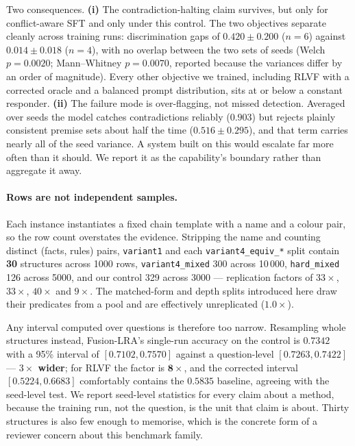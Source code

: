 \documentclass{article}
\begin{document}
Two consequences. \textbf{(i)} The contradiction-halting claim survives, but
only for conflict-aware SFT and only under this control. The two objectives
separate cleanly across training runs: discrimination gaps of
$0.420 \pm 0.200$ ($n{=}6$) against $0.014 \pm 0.018$ ($n{=}4$), with no overlap
between the two sets of seeds (Welch $p{=}0.0020$; Mann--Whitney $p{=}0.0070$,
reported because the variances differ by an order of magnitude). Every other
objective we trained, including \textsc{RLVF} with a corrected oracle and a
balanced prompt distribution, sits at or below a constant responder. \textbf{(ii)}
The failure mode is over-flagging, not missed detection. Averaged over seeds the
model catches contradictions reliably ($0.903$) but rejects plainly consistent
premise sets about half the time ($0.516 \pm 0.295$), and that term carries
nearly all of the seed variance. A system built on this would escalate far more
often than it should. We report it as the capability's boundary rather than
aggregate it away.

\paragraph{Rows are not independent samples.} Each instance instantiates a fixed
chain template with a name and a colour pair, so the row count overstates the
evidence. Stripping the name and counting distinct (facts, rules) pairs,
\texttt{variant1} and each \texttt{variant4\_equiv\_*} split contain
\textbf{30} structures across 1000 rows, \texttt{variant4\_mixed} 300 across
10\,000, \texttt{hard\_mixed} 126 across 5000, and our control 329 across 3000
--- replication factors of $33\times$, $33\times$, $40\times$ and $9\times$. The
matched-form and depth splits introduced here draw their predicates from a pool
and are effectively unreplicated ($1.0\times$).

Any interval computed over questions is therefore too narrow. Resampling whole
structures instead, Fusion-LRA's single-run accuracy on the control is
$0.7342$ with a 95\% interval of $[0.7102, 0.7570]$ against a question-level
$[0.7263, 0.7422]$ --- \textbf{$3\times$ wider}; for \textsc{RLVF} the factor is
$\mathbf{8\times}$, and the corrected interval $[0.5224, 0.6683]$ comfortably
contains the $0.5835$ baseline, agreeing with the seed-level test. We report
seed-level statistics for every claim about a method, because the training run,
not the question, is the unit that claim is about. Thirty structures is also few
enough to memorise, which is the concrete form of a reviewer concern about this
benchmark family.
\end{document}
